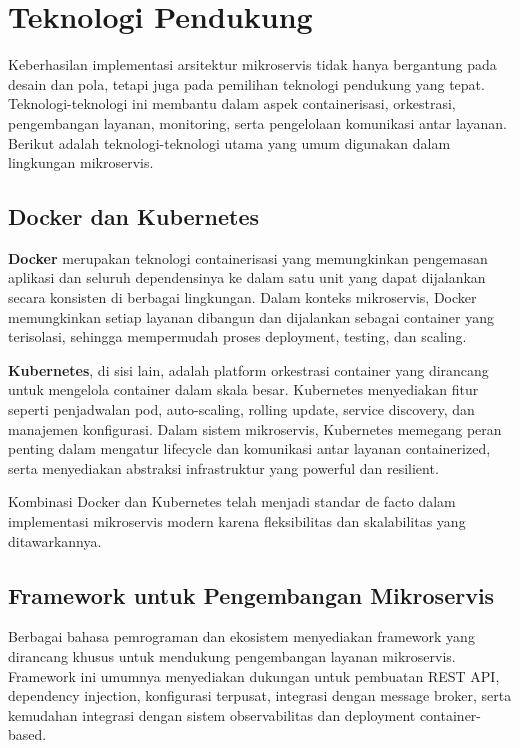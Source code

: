 \section{Teknologi Pendukung}

Keberhasilan implementasi arsitektur mikroservis tidak hanya bergantung pada desain dan pola, tetapi juga pada pemilihan teknologi pendukung yang tepat. Teknologi-teknologi ini membantu dalam aspek containerisasi, orkestrasi, pengembangan layanan, monitoring, serta pengelolaan komunikasi antar layanan. Berikut adalah teknologi-teknologi utama yang umum digunakan dalam lingkungan mikroservis.

\subsection{Docker dan Kubernetes}

\textbf{Docker} merupakan teknologi containerisasi yang memungkinkan pengemasan aplikasi dan seluruh dependensinya ke dalam satu unit yang dapat dijalankan secara konsisten di berbagai lingkungan. Dalam konteks mikroservis, Docker memungkinkan setiap layanan dibangun dan dijalankan sebagai container yang terisolasi, sehingga mempermudah proses deployment, testing, dan scaling.

\textbf{Kubernetes}, di sisi lain, adalah platform orkestrasi container yang dirancang untuk mengelola container dalam skala besar. Kubernetes menyediakan fitur seperti penjadwalan pod, auto-scaling, rolling update, service discovery, dan manajemen konfigurasi. Dalam sistem mikroservis, Kubernetes memegang peran penting dalam mengatur lifecycle dan komunikasi antar layanan containerized, serta menyediakan abstraksi infrastruktur yang powerful dan resilient.

Kombinasi Docker dan Kubernetes telah menjadi standar de facto dalam implementasi mikroservis modern karena fleksibilitas dan skalabilitas yang ditawarkannya.

\subsection{Framework untuk Pengembangan Mikroservis}

Berbagai bahasa pemrograman dan ekosistem menyediakan framework yang dirancang khusus untuk mendukung pengembangan layanan mikroservis. Framework ini umumnya menyediakan dukungan untuk pembuatan REST API, dependency injection, konfigurasi terpusat, integrasi dengan message broker, serta kemudahan integrasi dengan sistem observabilitas dan deployment container-based.

